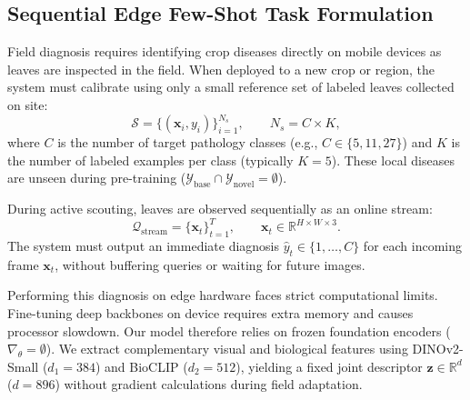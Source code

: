 \documentclass[preprint,12pt]{elsarticle}
\begin{document}
\subsection{Sequential Edge Few-Shot Task Formulation}
\label{sec:task_formulation}
Field diagnosis requires identifying crop diseases directly on mobile devices as leaves are inspected in the field. When deployed to a new crop or region, the system must calibrate using only a small reference set of labeled leaves collected on site:
\begin{equation}
    \mathcal{S} = \{(\mathbf{x}_i, y_i)\}_{i=1}^{N_s}, \qquad N_s = C \times K,
\end{equation}
where $C$ is the number of target pathology classes (e.g., $C \in \{5, 11, 27\}$) and $K$ is the number of labeled examples per class (typically $K = 5$). These local diseases are unseen during pre-training ($\mathcal{Y}_{\text{base}} \cap \mathcal{Y}_{\text{novel}} = \emptyset$).

During active scouting, leaves are observed sequentially as an online stream:
\begin{equation}
    \mathcal{Q}_{\text{stream}} = \{\mathbf{x}_t\}_{t=1}^{T}, \qquad \mathbf{x}_t \in \mathbb{R}^{H \times W \times 3}.
\end{equation}
The system must output an immediate diagnosis $\hat{y}_t \in \{1, \dots, C\}$ for each incoming frame $\mathbf{x}_t$, without buffering queries or waiting for future images.

Performing this diagnosis on edge hardware faces strict computational limits. Fine-tuning deep backbones on device requires extra memory and causes processor slowdown. Our model therefore relies on frozen foundation encoders ($\nabla_\theta = \emptyset$). We extract complementary visual and biological features using DINOv2-Small ($d_1 = 384$) and BioCLIP ($d_2 = 512$), yielding a fixed joint descriptor $\mathbf{z} \in \mathbb{R}^d$ ($d = 896$) without gradient calculations during field adaptation.
\end{document}
